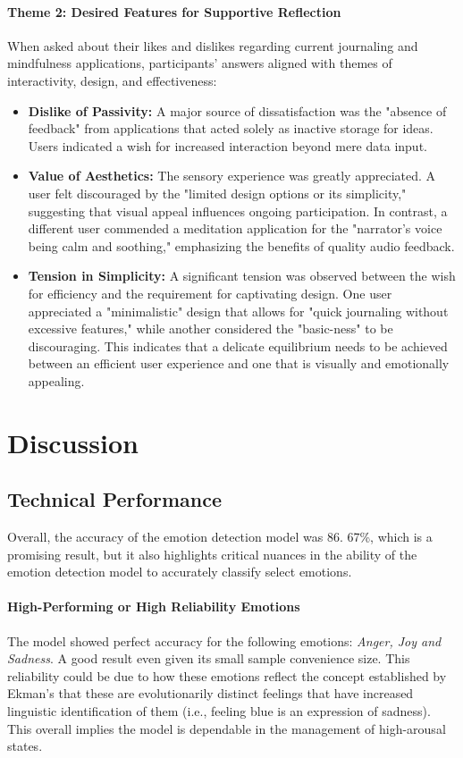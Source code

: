 \documentclass[conference]{IEEEtran}
\begin{document}
	\paragraph{Theme 2: Desired Features for Supportive Reflection}
	When asked about their likes and dislikes regarding current journaling and mindfulness applications, participants' answers aligned with themes of interactivity, design, and effectiveness:
	\begin{itemize}
		\item \textbf{Dislike of Passivity:} A major source of dissatisfaction was the "absence of feedback" from applications that acted solely as inactive storage for ideas. Users indicated a wish for increased interaction beyond mere data input.
		\item \textbf{Value of Aesthetics:} The sensory experience was greatly appreciated. A user felt discouraged by the "limited design options or its simplicity," suggesting that visual appeal influences ongoing participation. In contrast, a different user commended a meditation application for the "narrator's voice being calm and soothing," emphasizing the benefits of quality audio feedback.
		\item \textbf{Tension in Simplicity:} A significant tension was observed between the wish for efficiency and the requirement for captivating design. One user appreciated a "minimalistic" design that allows for "quick journaling without excessive features," while another considered the "basic-ness" to be discouraging. This indicates that a delicate equilibrium needs to be achieved between an efficient user experience and one that is visually and emotionally appealing.
	\end{itemize}
	
	
	\section{Discussion}
	\subsection{\textbf{Technical Performance}}
    Overall, the accuracy of the emotion detection model was 86. 67\%, which is a promising result, but it also highlights critical nuances in the ability of the emotion detection model to accurately classify select emotions.
    \paragraph{High-Performing or High Reliability Emotions}
    The model showed perfect accuracy for the following emotions: \textit{Anger, Joy and Sadness}. A good result even given its small sample convenience size. This reliability could be due to how these emotions reflect the concept established by Ekman's that these are evolutionarily distinct feelings that have increased linguistic identification of them (i.e., feeling blue is an expression of sadness). This overall implies the model is dependable in the management of high-arousal states.
\end{document}
